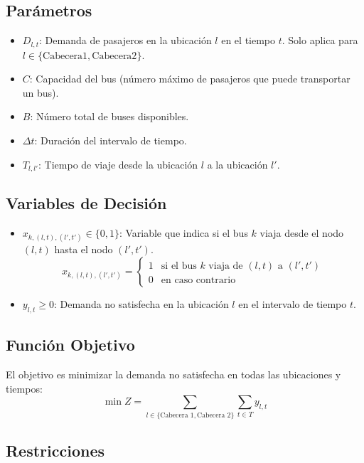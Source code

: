 \documentclass[preprint,11pt]{elsarticle}
\begin{document}
\subsection{Parámetros}
\begin{itemize}
    \item $D_{l,t}$: Demanda de pasajeros en la ubicación $l$ en el tiempo $t$. Solo aplica para $l \in \{\text{Cabecera1}, \text{Cabecera2}\}$.
    \item $C$: Capacidad del bus (número máximo de pasajeros que puede transportar un bus).
    \item $B$: Número total de buses disponibles.
    \item $\Delta t$: Duración del intervalo de tiempo.
    \item $T_{l,l'}$: Tiempo de viaje desde la ubicación $l$ a la ubicación $l'$.
\end{itemize}

\subsection{Variables de Decisión}
\begin{itemize}
    \item $x_{k,(l,t),(l',t')} \in \{0,1\}$: Variable que indica si el bus $k$ viaja desde el nodo $(l,t)$ hasta el nodo $(l',t')$.
    \[
    x_{k,(l,t),(l',t')} =
    \begin{cases}
        1 & \text{si el bus } k \text{ viaja de } (l,t) \text{ a } (l',t') \\
        0 & \text{en caso contrario}
    \end{cases}
    \]
    
    \item $y_{l,t} \geq 0$: Demanda no satisfecha en la ubicación $l$ en el intervalo de tiempo $t$.
\end{itemize}

\subsection{Función Objetivo}
El objetivo es minimizar la demanda no satisfecha en todas las ubicaciones y tiempos:
\[
\min Z = \sum_{l \in \{\text{Cabecera 1}, \text{Cabecera 2}\}} \sum_{t \in T} y_{l,t}
\]

\subsection{Restricciones}
\end{document}
